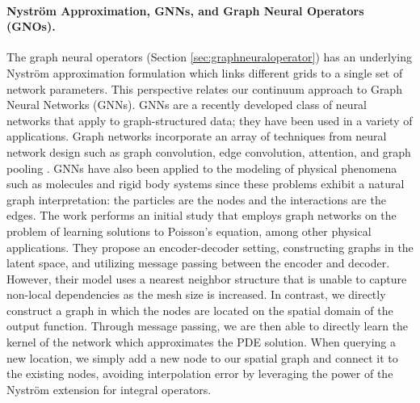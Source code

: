 \paragraph{Nystr\"om Approximation, GNNs, and Graph Neural Operators (GNOs).} 
The graph neural operators (Section \ref{sec:graphneuraloperator}) has an underlying Nystr\"om approximation formulation \citep{nystrom1930praktische} which links different grids to a single set of network parameters. This perspective relates our continuum approach to Graph Neural Networks (GNNs). GNNs are a recently developed class of neural networks that apply to graph-structured data; they
have been used in a variety of applications. Graph networks incorporate an array of techniques from neural network design such as graph convolution, edge convolution, attention, and graph pooling  \citep{kipf2016semi,hamilton2017inductive,gilmer2017neural,velivckovic2017graph,murphy2018janossy}. 
GNNs have also been applied to the modeling of physical phenomena such as molecules \citep{chen2019graph} and rigid body systems \citep{battaglia2018relational} since these problems exhibit a natural graph interpretation: the particles are the nodes and the interactions are the edges. The work \citep{pmlr-v97-alet19a} performs an initial study that employs graph networks on the problem of learning solutions to Poisson's equation, among other physical applications. They propose an encoder-decoder setting, constructing graphs in the latent space, and utilizing message passing between the encoder and decoder. However, their model uses a nearest neighbor structure that is unable to capture non-local dependencies as the mesh size is increased.
In contrast, we directly construct a graph in which the nodes are located on the spatial domain of the output function. Through message passing, we are then able to directly learn the kernel of the network
which approximates the PDE solution. When querying a new location, we simply add a new node to our spatial graph and connect it to the existing nodes, avoiding interpolation error by leveraging the power of the Nystr\"om extension for integral operators.

